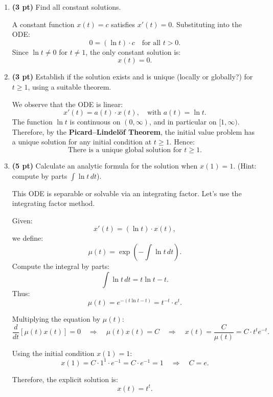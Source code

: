 \begin{enumerate}[label=(\alph*)]

\item \textbf{(3 pt)} Find all constant solutions.

A constant function \( x(t) = c \) satisfies \( x'(t) = 0 \). Substituting into the ODE:
\[
0 = (\ln t) \cdot c \quad \text{for all } t > 0.
\]
Since \( \ln t \neq 0 \) for \( t \neq 1 \), the only constant solution is:
\[
\boxed{x(t) = 0}.
\]

\item \textbf{(3 pt)} Establish if the solution exists and is unique (locally or globally?) for \( t \geq 1 \), using a suitable theorem.

We observe that the ODE is linear:
\[
x'(t) = a(t) \cdot x(t), \quad \text{with } a(t) = \ln t.
\]
The function \( \ln t \) is continuous on \( (0, \infty) \), and in particular on \( [1, \infty) \). Therefore, by the \textbf{Picard–Lindelöf Theorem}, the initial value problem has a unique solution for any initial condition at \( t \geq 1 \). Hence:
\[
\boxed{\text{There is a unique global solution for } t \geq 1.}
\]

\item \textbf{(5 pt)} Calculate an analytic formula for the solution when \( x(1) = 1 \). (Hint: compute by parts \( \int \ln t \, dt \)).

This ODE is separable or solvable via an integrating factor. Let's use the integrating factor method.

Given:
\[
x'(t) = (\ln t) \cdot x(t),
\]
we define:
\[
\mu(t) = \exp\left(-\int \ln t \, dt\right).
\]
Compute the integral by parts:
\[
\int \ln t \, dt = t \ln t - t.
\]
Thus:
\[
\mu(t) = e^{-(t \ln t - t)} = t^{-t} \cdot e^{t}.
\]

Multiplying the equation by \( \mu(t) \):
\[
\frac{d}{dt}[\mu(t) x(t)] = 0 \quad \Rightarrow \quad \mu(t) x(t) = C \quad \Rightarrow \quad x(t) = \frac{C}{\mu(t)} = C \cdot t^t e^{-t}.
\]

Using the initial condition \( x(1) = 1 \):
\[
x(1) = C \cdot 1^1 \cdot e^{-1} = C \cdot e^{-1} = 1 \quad \Rightarrow \quad C = e.
\]

Therefore, the explicit solution is:
\[
\boxed{x(t) = t^t}.
\]

\end{enumerate}